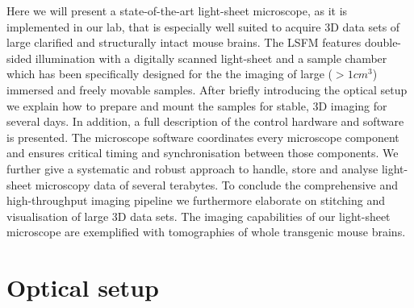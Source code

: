 \documentclass[12pt]{spieman}  %
\begin{document}
Here we will present a state-of-the-art light-sheet microscope, as it is implemented in our lab, that is especially well suited to acquire 3D data sets of large clarified and structurally intact mouse brains. The LSFM features double-sided illumination with a digitally scanned light-sheet and a sample chamber which has been specifically designed for the the imaging of large ($> 1cm^3$) immersed and freely movable samples. After briefly introducing the optical setup we explain how to prepare and mount the samples for stable, 3D imaging for several days. In addition, a full description of the control hardware and software is presented. The microscope software coordinates every microscope component and ensures critical timing and synchronisation between those components. %
We further give a systematic and robust approach to handle, store and analyse light-sheet microscopy data of several terabytes. To conclude the comprehensive and high-throughput imaging pipeline we furthermore elaborate on stitching and visualisation of large 3D data sets. The imaging capabilities of our light-sheet microscope are exemplified with tomographies of whole transgenic mouse brains.


\section{Optical setup}
\end{document}
